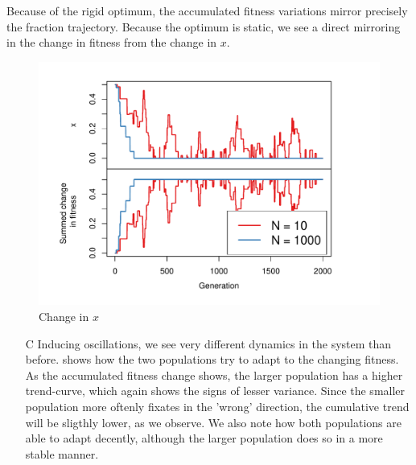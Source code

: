 \documentclass[10pt]{article}\usepackage[]{graphicx}\usepackage[]{color}
\makeatletter
\def\maxwidth{ %
  \ifdim\Gin@nat@width>\linewidth
    \linewidth
  \else
    \Gin@nat@width
  \fi
}
\theoremstyle{plain}
\makeatother
\begin{document}
\begin{multicols*}{2}
\begin{enumerate}
  Because of the rigid optimum, the accumulated fitness variations mirror precisely the fraction trajectory. Because the optimum is static, we see a direct mirroring in the change in fitness from the change in $x$. 
\end{enumerate}

\begin{Schunk}
\begin{figure}[H]

{\centering \includegraphics[width=\maxwidth]{figure/twocolumn-fisherb-1} 

}

\caption[Change in $x$]{Change in $x$}\label{fig:fisherb}
\end{figure}
\end{Schunk}
\begin{enumerate}
  \item[C] Inducing oscillations, we see very different dynamics in the system than before.  shows how the two populations try to adapt to the changing fitness. As the accumulated fitness change shows, the larger population has a higher trend-curve, which again shows the signs of lesser variance. Since the smaller population more oftenly fixates in the 'wrong' direction, the cumulative trend will be sligthly lower, as we observe. We also note how both populations are able to adapt decently, although the larger population does so in a more stable manner.  
\end{enumerate}

\begin{Schunk}
\begin{figure}[H]


\end{figure}
\end{Schunk}
\end{multicols*}
\end{document}
